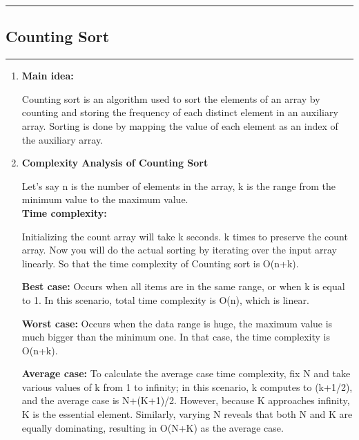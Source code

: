\documentclass[11pt,a4paper]{article}
\begin{document}
{		\rule{15cm}{0.1cm}
		\subsection{Counting Sort}
		\rule{15cm}{0.1cm}
			\begin{enumerate}[label=\textbf{\arabic*})]
				\item \textbf{Main idea:}
				
					Counting sort is an algorithm used to sort the elements of an array by counting and storing the frequency of each distinct element in an auxiliary array. Sorting is done by mapping the value of each element as an index of the auxiliary array.
				\\[12pt]
				\item \textbf{Complexity Analysis of Counting Sort}
					
					Let’s say n is the number of elements in the array, k is the range from the minimum value to the maximum value. 
					\\[9pt]
					\textbf{Time complexity:}
					
					Initializing the count array will take k seconds. k times to preserve the count array. Now you will do the actual sorting by iterating over the input array linearly.
					So that the time complexity of Counting sort is O(n+k).
					
					\textbf{Best case:} Occurs when all items are in the same range, or when k is equal to 1. In this scenario,  total time complexity is O(n), which is linear.
					
					\textbf{Worst case:} Occurs when the data range is huge, the maximum value is much bigger than the minimum one. In that case, the time complexity is O(n+k).
					
					\textbf{Average case:} To calculate the average case time complexity, fix N and take various values of k from 1 to infinity; in this scenario, k computes to (k+1/2), and the average case is N+(K+1)/2. However, because K approaches infinity, K is the essential element. Similarly, varying N reveals that both N and K are equally dominating, resulting in O(N+K) as the average case.
					

\end{enumerate}}
\end{document}
